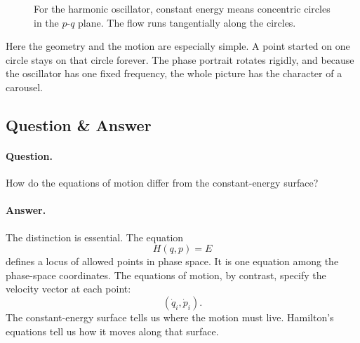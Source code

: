 \begin{figure}[h]
\centering
{}
\caption{For the harmonic oscillator, constant energy means concentric circles in the \(p\)-\(q\) plane. The flow runs tangentially along the circles.}
\end{figure}

Here the geometry and the motion are especially simple. A point started on one circle stays on that circle forever. The phase portrait rotates rigidly, and because the oscillator has one fixed frequency, the whole picture has the character of a carousel.

\subsection{Question \& Answer}

\paragraph{Question.} How do the equations of motion differ from the constant-energy surface?

\paragraph{Answer.} The distinction is essential. The equation
\begin{equation}
H(q,p)=E
\end{equation}
defines a locus of allowed points in phase space. It is one equation among the phase-space coordinates. The equations of motion, by contrast, specify the velocity vector at each point:
\begin{equation}
(\dot q_i,\dot p_i).
\end{equation}
The constant-energy surface tells us where the motion must live. Hamilton's equations tell us how it moves along that surface.

